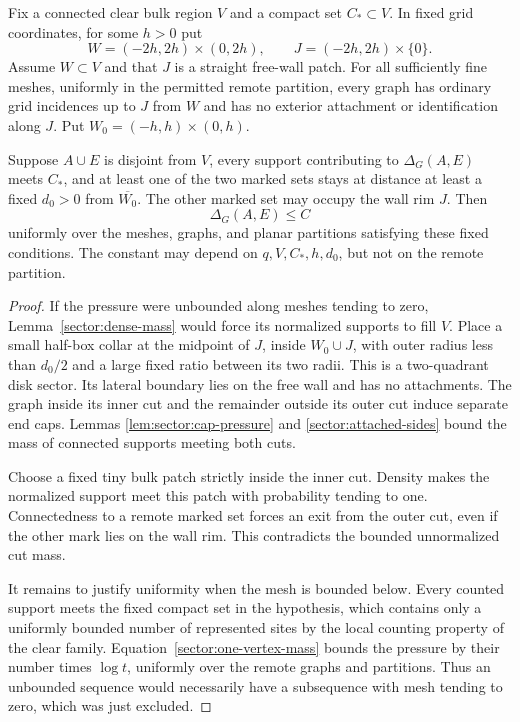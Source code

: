 \begin{lemma}
\label{sector:free-wall}
Fix a connected clear bulk region $V$ and a compact set $C_*\subset V$.
In fixed grid coordinates, for some $h>0$ put
\[
 W=(-2h,2h)\times(0,2h),\qquad
 J=(-2h,2h)\times\{0\}.
\]
Assume $W\subset V$ and that $J$ is a straight free-wall patch.
For all sufficiently fine meshes, uniformly in the permitted remote
partition, every graph has ordinary grid incidences up to $J$ from
$W$ and has no exterior attachment or identification along $J$.
Put $W_0=(-h,h)\times(0,h)$.

Suppose $A\cup E$ is disjoint from $V$, every support contributing to
$\Delta_G(A,E)$ meets $C_*$, and at least one of the two marked sets
stays at distance at least a fixed $d_0>0$ from $\overline{W_0}$.
The other marked set may occupy the wall rim $J$.  Then
\begin{equation}
 \Delta_G(A,E)\le C
 \label{sector:free-wall-bound}
\end{equation}
uniformly over the meshes, graphs, and planar partitions satisfying
these fixed conditions.  The constant may depend on $q,V,C_*,h,d_0$,
but not on the remote partition.
\end{lemma}

\begin{proof}
If the pressure were unbounded along meshes tending to zero,
Lemma~\ref{sector:dense-mass} would force its normalized supports to
fill $V$.  Place a small half-box collar at the midpoint of $J$,
inside $W_0\cup J$, with outer radius less than $d_0/2$ and a large
fixed ratio between its two radii.  This is a two-quadrant
disk sector.  Its lateral boundary lies on the free wall and has no
attachments.  The graph inside its inner cut and the remainder
outside its outer cut induce separate end caps.  Lemmas
\ref{lem:sector:cap-pressure} and \ref{sector:attached-sides} bound
the mass of connected supports meeting both cuts.

Choose a fixed tiny bulk patch strictly inside the inner cut.
Density makes the normalized support meet this patch with probability
tending to one.  Connectedness to a remote marked set forces an exit
from the outer cut, even if the other mark lies on the wall rim.
This contradicts the bounded unnormalized cut mass.

It remains to justify uniformity when the mesh is bounded below.
Every counted support meets the fixed compact set in the hypothesis,
which contains only a uniformly bounded number of represented sites
by the local counting property of the clear family.
Equation~\eqref{sector:one-vertex-mass} bounds the pressure by their
number times $\log t$, uniformly over the remote graphs and
partitions.  Thus an unbounded sequence would necessarily have a
subsequence with mesh tending to zero, which was just excluded.
\end{proof}

